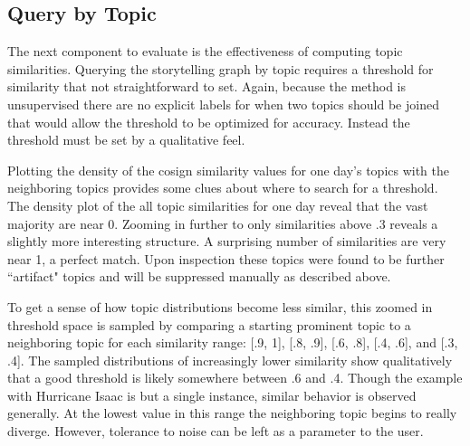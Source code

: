 \documentclass[10pt]{article}
\begin{document}
\subsection {Query by Topic}
The next component to evaluate is the effectiveness of computing topic similarities.  Querying the storytelling graph by topic requires a threshold for similarity that not straightforward to set.  Again, because the method is unsupervised there are no explicit labels for when two topics should be joined that would allow the threshold to be optimized for accuracy.   Instead the threshold must be set by a qualitative feel.

Plotting the density of the cosign similarity values for one day's topics with the neighboring topics provides some clues about where to search for a threshold.  The density plot of the all topic similarities for one day reveal that the vast majority are near 0.  Zooming in further to only similarities above .3 reveals a slightly more interesting structure.  A surprising number of similarities are very near 1, a perfect match.  Upon inspection these topics were found to be further ``artifact" topics and will be suppressed manually as described above.

To get a sense of how topic distributions become less similar, this zoomed in threshold space is sampled by comparing a starting prominent topic to a neighboring topic for each similarity range: [.9, 1], [.8, .9], [.6, .8], [.4, .6], and [.3, .4]. The sampled distributions of increasingly lower similarity show qualitatively that a good threshold is likely somewhere between .6 and .4.  Though the example with Hurricane Isaac is but a single instance, similar behavior is observed generally. At the lowest value in this range the neighboring topic begins to really diverge.  However, tolerance to noise can be left as a parameter to the user. 
\end{document}
